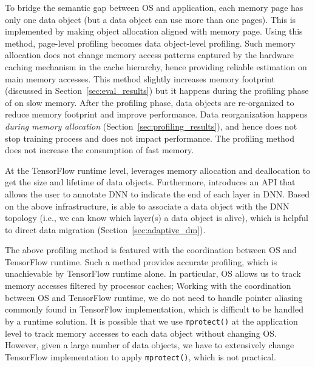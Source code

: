 To bridge the semantic gap between OS and application, each memory page has only one data object (but a data object can use more than one pages). \textcolor{check}{This is implemented by making object allocation aligned with memory page.} Using this method, page-level profiling becomes data object-level profiling. Such memory allocation does not change memory access patterns captured by the hardware caching mechanism in the cache hierarchy, hence providing reliable estimation on main memory accesses. %
This method slightly increases memory footprint (discussed in Section~\ref{sec:eval_results}) but it  happens during the profiling phase of \name on slow memory. After the profiling phase, data objects are re-organized to reduce memory footprint and improve performance. Data reorganization happens \textit{during memory allocation}  (Section~\ref{sec:profiling_results}), and hence does not stop training process and does not impact performance. The profiling method does not increase the consumption of fast memory. 


At the TensorFlow runtime level, \name leverages memory allocation and deallocation to get the size and lifetime of data objects. Furthermore, \name introduces an API that allows the user to annotate DNN to indicate the end of each layer in DNN.
Based on the above infrastructure, \name is able to associate a data object with the DNN topology (i.e., we can know which layer(s) a data object is alive), 
which is helpful to direct data migration (Section~\ref{sec:adaptive_dm}). 

\textcolor{check}{The above profiling method is featured with the coordination between OS and TensorFlow runtime. Such a method provides accurate profiling, which is unachievable by TensorFlow runtime alone. In particular, OS allows us to track memory accesses filtered by processor caches; Working with the coordination between OS and TensorFlow runtime, we do not need to handle pointer aliasing commonly found in TensorFlow implementation, which is difficult to be handled by a runtime solution. It is possible that we use \texttt{mprotect()} at the application level to track memory accesses to each data object without changing OS. However, given a large number of data objects, we have to extensively change TensorFlow implementation to apply \texttt{mprotect()}, which is not practical.}



